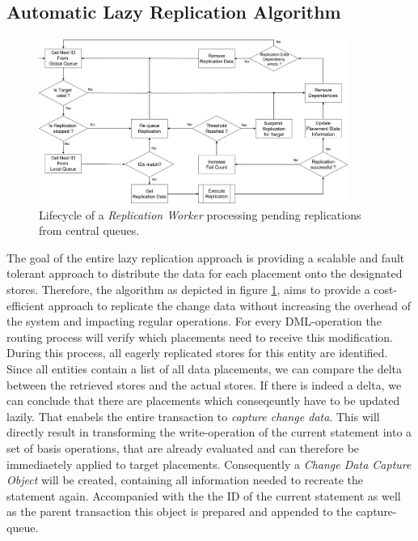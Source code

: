 
\subsection{Automatic Lazy Replication Algorithm}
\label{sec:algo}

\begin{figure}[t] 
    \centering
    \includegraphics[width=0.9\textwidth]{Figures/flow_worker.png}
    \caption{Lifecycle of a \textit{Replication Worker} processing pending replications from central queues.}
    \label{fig:flow_worker}
\end{figure}

The goal of the entire lazy replication approach is providing a scalable and fault tolerant approach to distribute the data for each placement onto the designated stores.
Therefore, the algorithm as depicted in figure \ref{fig:flow_worker}, aims to provide a cost-efficient approach to replicate the change data without increasing 
the overhead of the system and impacting regular operations. 
For every DML-operation the routing process will verify which placements need to receive this modification. During this process, all eagerly replicated stores for this entity
are identified. Since all entities contain a list of all data placements, we can compare the delta between the retrieved stores and the actual stores. 
If there is indeed a delta, we can conclude that there are placements which conseqeuntly have to be updated lazily. 
That enabels the entire transaction to \emph{capture change data}. This will directly result in transforming the write-operation of the current statement into a set of basis 
operations, that are already evaluated and can therefore be immediaetely applied to target placements. Consequently a \emph{Change Data Capture Object} will be created, 
containing all information needed to recreate the statement again. Accompanied with the the ID of the current statement as well as the parent transaction this object is prepared
and appended to the capture-queue.\\

